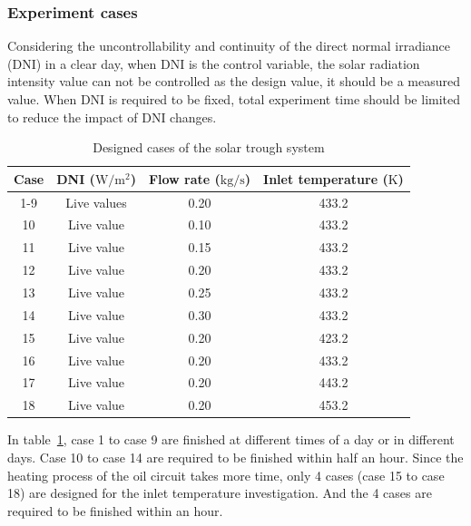 \subsubsection{Experiment cases}


Considering the uncontrollability and continuity of the direct normal irradiance (DNI) in a clear day, when DNI is the control variable, the solar radiation intensity value can not be controlled as the design value, it should be a measured value. When DNI is required to be fixed, total experiment time should be limited to reduce the impact of DNI changes.

\begin{table}[htbp]\footnotesize
	\caption{Designed cases of the solar trough system}
	\begin{center}
	\begin{tabular}{cccc}
		\toprule
		Case	& DNI ($\mathrm{W/m^2}$)	&	Flow rate ($\mathrm{kg/s}$)			&	Inlet temperature ($\mathrm{K}$)\\
		\midrule
		1-9	&	Live values	&	0.20	&	433.2\\
		10	&	Live value	&	0.10	&	433.2\\
		11	&	Live value	&	0.15	&	433.2\\
		12	&	Live value	&	0.20	&	433.2\\
		13	&	Live value	&	0.25	&	433.2\\
		14	&	Live value	&	0.30	&	433.2\\
		15	&	Live value	&	0.20	&	423.2\\
		16	&	Live value	&	0.20	&	433.2\\
		17	&	Live value	&	0.20	&	443.2\\
		18	&	Live value	&	0.20	&	453.2\\
		\bottomrule
	\end{tabular}
	\end{center}
	\label{tab:DesignedCasesForTrough}
\end{table}

In table~\ref{tab:DesignedCasesForTrough}, case 1 to case 9 are finished at different times of a day or in different days. Case 10 to case 14 are required to be finished within half an hour. Since the heating process of the oil circuit takes more time, only 4 cases (case 15 to case 18) are designed for the inlet temperature investigation. And the 4 cases are required to be finished within an hour.

